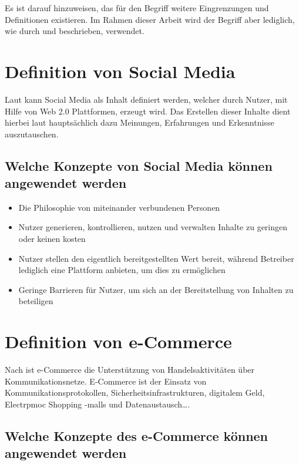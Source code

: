 Es ist darauf hinzuweisen, das für den Begriff  weitere Eingrenzungen und Definitionen existieren. Im Rahmen dieser Arbeit wird der Begriff aber lediglich, wie durch \textcite{oreilly:web20} und \textcite{oreilly:levels-of-web20} beschrieben, verwendet.


\section{Definition von Social Media}

Laut \textcite[S. 8]{turban:sc} kann Social Media als Inhalt definiert werden, welcher durch Nutzer, mit Hilfe von Web 2.0 Plattformen, erzeugt wird. Das Erstellen dieser Inhalte dient hierbei laut \textcite[S. 8]{turban:sc} hauptsächlich dazu Meinungen, Erfahrungen und Erkenntnisse auszutauschen.


\subsection{Welche Konzepte von Social Media können angewendet werden}

\begin{itemize}
\item Die Philosophie von miteinander verbundenen Personen \parencite[S. 8]{turban:sc}
\item Nutzer generieren, kontrollieren, nutzen und verwalten Inhalte zu geringen
oder keinen kosten \parencite[S. 8]{turban:sc}
\item Nutzer stellen den eigentlich bereitgestellten Wert bereit, während Betreiber lediglich eine Plattform anbieten, um dies zu ermöglichen  \parencite[S. 8]{turban:sc}
\item Geringe Barrieren für Nutzer, um sich an der Bereitstellung von Inhalten zu beteiligen \parencite[S. 8]{turban:sc}
\end{itemize}


\section{Definition von  e-Commerce}

Nach \textcite[S. 20]{merz:e-commerce} ist e-Commerce  \glqq die Unterstützung von Handelsaktivitäten über Kommunikationsnetze\grqq. E-Commerce ist der Einsatz von Kommunikationsprotokollen, Sicherheitsinfrastrukturen, digitalem Geld, Electrpmoc Shopping -malls und Datenaustausch….\grqq


\subsection{Welche Konzepte des e-Commerce können angewendet werden}

